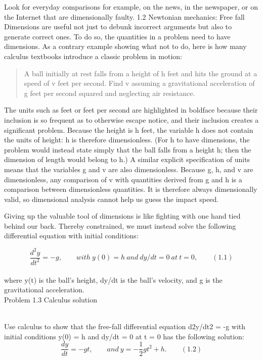 \documentclass[12pt]{article}
\begin{document}
{Look for everyday comparisons for example, on the news, in the newspaper,
or on the Internet that are dimensionally faulty.
1.2 Newtonian mechanics: Free fall
Dimensions are useful not just to debunk incorrect arguments but also to
generate correct ones. To do so, the quantities in a problem need to have
dimensions. As a contrary example showing what not to do, here is how
many calculus textbooks introduce a classic problem in motion:
\begin{quote}
A ball initially at rest falls from a height of h feet and hits the ground at a
speed of v feet per second. Find v assuming a gravitational acceleration of g
feet per second squared and neglecting air resistance.
\end{quote}
The units such as feet or feet per second are highlighted in boldface
because their inclusion is so frequent as to otherwise escape notice, and
their inclusion creates a significant problem. Because the height is h
feet, the variable h does not contain the units of height: h is therefore
dimensionless. (For h to have dimensions, the problem would instead
state simply that the ball falls from a height h; then the dimension of
length would belong to h.) A similar explicit specification of units means
that the variables g and v are also dimensionless. Because g, h, and v
are dimensionless, any comparison of v with quantities derived from g
and h is a comparison between dimensionless quantities. It is therefore
always dimensionally valid, so dimensional analysis cannot help us guess
the impact speed.

Giving up the valuable tool of dimensions is like fighting with one hand
tied behind our back. Thereby constrained, we must instead solve the
following differential equation with initial conditions:

$$\frac{d^{2}y}{dt^{2}}=-g,\qquad with\ y(0) = h\ and\ dy/dt = 0\ at\ t = 0, \qquad (1.1)$$\\

\pagestyle{fancy} 
\renewcommand{\headrulewidth}{0pt} 
\fancyhf{}
where y(t) is the ball’s height, dy/dt is the ball’s velocity,  and g is the
gravitational acceleration.\\

Problem 1.3 Calculus solution \\\

Use calculus to show that the free-fall differential equation d2y/dt2 = -g with
initial conditions y(0) = h and dy/dt = 0 at t = 0 has the following solution:
$$\frac{dy}{dt}=-gt,\qquad and\ y = -\frac{1}{2}gt^{2}+h . \qquad  (1.2) $$

}
\end{document}
